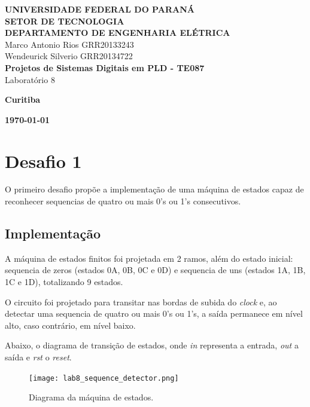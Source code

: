 \documentclass[12pt]{article}
\begin{document}
    
\begin{titlepage}
 \vfill
  \begin{center}
   {\large \textbf{UNIVERSIDADE FEDERAL DO PARANÁ \\ SETOR DE TECNOLOGIA \\ DEPARTAMENTO DE ENGENHARIA ELÉTRICA}} \\[5cm]

  {\large {Marco Antonio Rios  GRR20133243 \\ Wendeurick Silverio GRR20134722} }\\[4cm]


   {\Large \textbf{Projetos de Sistemas Digitais em PLD - TE087} \\ Laboratório 8}\\[6cm]
    \vfill

    \vspace{2cm}

    \large \textbf{Curitiba}

    \large \textbf{\today}

      \end{center}
\end{titlepage}

\clearpage
\section{Desafio 1}
O primeiro desafio propõe a implementação de uma máquina de estados capaz de reconhecer sequencias de quatro ou mais 0's ou 1's consecutivos.
\subsection{Implementação}
A máquina de estados finitos foi projetada em 2 ramos, além do estado inicial: sequencia de zeros (estados 0A, 0B, 0C e 0D) e sequencia de uns (estados 1A, 1B, 1C e 1D), totalizando 9 estados.

O circuito foi projetado para transitar nas bordas de subida do \emph{clock} e, ao detectar uma sequencia de quatro ou mais 0's ou 1's, a saída permanece em nível alto, caso contrário, em nível baixo.

Abaixo, o diagrama de transição de estados, onde \emph{in} representa a entrada, \emph{out} a saída e \emph{rst} o \emph{reset}. 

\begin{figure}[!h]
    \centering
    \texttt{[image: lab8\_sequence\_detector.png]}
    \caption{Diagrama da máquina de estados.}
\end{figure}
\end{document}
